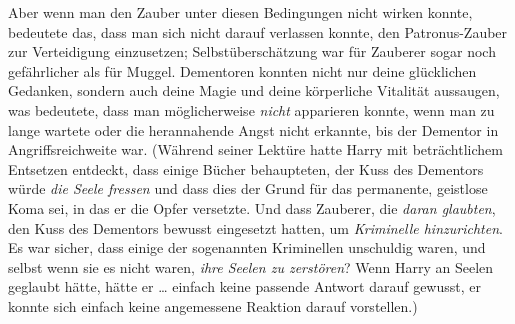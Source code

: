 Aber wenn man den Zauber unter diesen Bedingungen nicht wirken konnte, bedeutete das, dass man sich nicht darauf verlassen konnte, den Patronus-Zauber zur Verteidigung einzusetzen; Selbstüberschätzung war für Zauberer sogar noch gefährlicher als für Muggel. Dementoren konnten nicht nur deine glücklichen Gedanken, sondern auch deine Magie und deine körperliche Vitalität aussaugen, was bedeutete, dass man möglicherweise \emph{nicht} apparieren konnte, wenn man zu lange wartete oder die herannahende Angst nicht erkannte, bis der Dementor in Angriffsreichweite war. (Während seiner Lektüre hatte Harry mit beträchtlichem Entsetzen entdeckt, dass einige Bücher behaupteten, der Kuss des Dementors würde \emph{die Seele fressen} und dass dies der Grund für das permanente, geistlose Koma sei, in das er die Opfer versetzte. Und dass Zauberer, die \emph{daran glaubten}, den Kuss des Dementors bewusst eingesetzt hatten, um \emph{Kriminelle hinzurichten}. Es war sicher, dass einige der sogenannten Kriminellen unschuldig waren, und selbst wenn sie es nicht waren, \emph{ihre Seelen zu zerstören}? Wenn Harry an Seelen geglaubt hätte, hätte er … einfach keine passende Antwort darauf gewusst, er konnte sich einfach keine angemessene Reaktion darauf vorstellen.)

